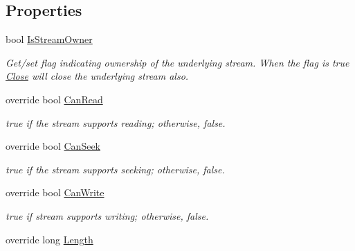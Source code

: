 \subsection*{Properties}
\begin{DoxyCompactItemize}
\item 
bool \hyperlink{class_i_c_sharp_code_1_1_sharp_zip_lib_1_1_tar_1_1_tar_output_stream_a5d30d12b3c98a5b45d17b54291e8b50d}{Is\+Stream\+Owner}
\begin{DoxyCompactList}\small\item\em Get/set flag indicating ownership of the underlying stream. When the flag is true \hyperlink{class_i_c_sharp_code_1_1_sharp_zip_lib_1_1_tar_1_1_tar_output_stream_ab744534cafac308f51f6586f06ca3d86}{Close} will close the underlying stream also. \end{DoxyCompactList}\item 
override bool \hyperlink{class_i_c_sharp_code_1_1_sharp_zip_lib_1_1_tar_1_1_tar_output_stream_aba911bf812fc9917b0848f3632a14b83}{Can\+Read}
\begin{DoxyCompactList}\small\item\em true if the stream supports reading; otherwise, false. \end{DoxyCompactList}\item 
override bool \hyperlink{class_i_c_sharp_code_1_1_sharp_zip_lib_1_1_tar_1_1_tar_output_stream_ad56c718966c21dfcc32c9e5bd1cd09aa}{Can\+Seek}
\begin{DoxyCompactList}\small\item\em true if the stream supports seeking; otherwise, false. \end{DoxyCompactList}\item 
override bool \hyperlink{class_i_c_sharp_code_1_1_sharp_zip_lib_1_1_tar_1_1_tar_output_stream_a68c49d13919ba74627cb02da9fe7a06f}{Can\+Write}
\begin{DoxyCompactList}\small\item\em true if stream supports writing; otherwise, false. \end{DoxyCompactList}\item 
override long \hyperlink{class_i_c_sharp_code_1_1_sharp_zip_lib_1_1_tar_1_1_tar_output_stream_accafd9a29ea57582d2cd3cabb278fe35}{Length}

\end{DoxyCompactItemize}

